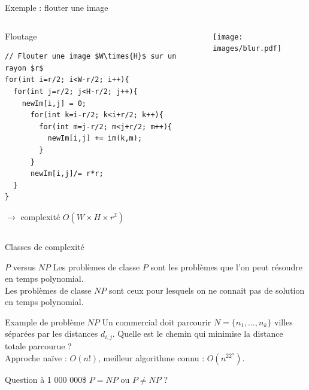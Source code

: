 \documentclass{beamer}
\begin{document}
\begin{frame}[fragile]{Exemple : flouter une image}
\begin{columns}
\begin{column}{0.65\linewidth}
\begin{exampleblock}{Floutage}
\begin{verbatim}
// Flouter une image $W\times{H}$ sur un rayon $r$
for(int i=r/2; i<W-r/2; i++){
  for(int j=r/2; j<H-r/2; j++){
    newIm[i,j] = 0;
      for(int k=i-r/2; k<i+r/2; k++){
        for(int m=j-r/2; m<j+r/2; m++){
          newIm[i,j] += im(k,m);
        }
      }
      newIm[i,j]/= r*r;
  }
}
\end{verbatim}
$\rightarrow$ complexité $O(W\times{H}\times{r^2})$
\end{exampleblock}
\end{column}
\begin{column}{0.35\linewidth}
\texttt{[image: images/blur.pdf]}
\end{column}
\end{columns}
\end{frame}


\begin{frame}{Classes de complexité}
\begin{block}{$P$ versus $NP$}
Les problèmes de classe $P$ sont les problèmes que l'on peut résoudre en temps polynomial.\\
Les problèmes de classe $NP$ sont ceux pour lesquels on ne connait pas de solution en temps polynomial.
\end{block}

\begin{exampleblock}{Example de problème $NP$}
Un commercial doit parcourir $N = \{n_1,\dots,n_k\}$ villes séparées par les distances $d_{i,j}$. Quelle est le chemin qui minimise la distance totale parcourue ?\\
Approche naïve : $O(n!)$, meilleur algorithme connu : $O(n^22^n)$.
\end{exampleblock}

\begin{alertblock}{Question à 1 000 000\$}
$P = NP$ ou $P \neq NP$ ?
\end{alertblock}
\end{frame}
\end{document}

